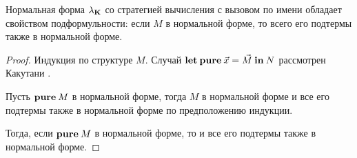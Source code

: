 \begin{theorem}
$ $

Нормальная форма $\lambda_{{\bf K}}$ со стратегией вычисления с вызовом по имени обладает свойством подформульности: если $M$ в нормальной форме, то всего его подтермы также в нормальной форме.

\end{theorem}

\begin{proof}
Индукция по структуре $M$.
Случай ${\bf let \: pure\:} \vec{x} = \vec{M} {\: \bf in \:} N$ рассмотрен Какутани \cite{ModalK} \cite{ModalK1}.

Пусть ${\bf pure \:} M$ в нормальной форме, тогда $M$ в нормальной форме и все его подтермы также в нормальной форме по предположению индукции.

Тогда, если ${\bf pure \:} M$ в нормальной форме, то и все его подтермы также в нормальной форме.
\end{proof}
